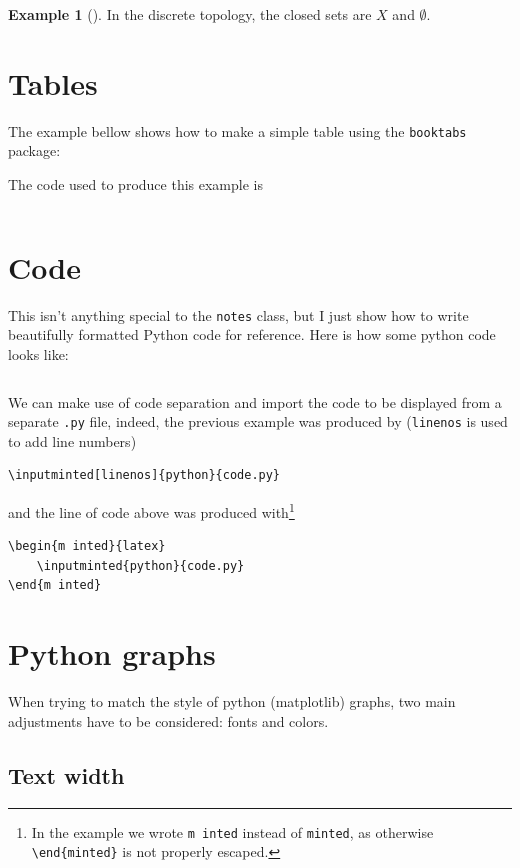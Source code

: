 \documentclass[letterpaper,11pt]{notes}
\theoremstyle{definition}
\newtheorem{Iexm}{Example}[section]
\theoremstyle{plain}
\newenvironment{exampleA}[2]
    {\begin{Iexm}[#1]\ifstrempty{#2}{}{\label{exmA:#2}}}
    {\end{Iexm}}
\theoremstyle{remark}
\begin{document}
\begin{exampleA}{}{}
In the discrete topology, the closed sets are $X$ and $\emptyset$.
\end{exampleA}

\section{Tables}

The example bellow shows how to make a simple table using the \texttt{booktabs} package:



The code used to produce this example is
\inputminted{latex}{table.tex}

\section{Code}

This isn't anything special to the \texttt{notes} class, but I just show how to write beautifully formatted Python code for reference. Here is how some python code looks like:
\inputminted[linenos]{python}{code.py}%
We can make use of code separation and import the code to be displayed from a separate \texttt{.py} file, indeed, the previous example was produced by (\texttt{linenos} is used to add line numbers)
\begin{verbatim}
\inputminted[linenos]{python}{code.py}
\end{verbatim}
and the line of code above was produced with\footnote{In the example we wrote \texttt{m inted} instead of \texttt{minted}, as otherwise \texttt{\textbackslash{}end\{minted\}} is not properly escaped.}
\begin{verbatim}
\begin{m inted}{latex}
    \inputminted{python}{code.py}
\end{m inted}
\end{verbatim}

\section{Python graphs}

When trying to match the style of python (matplotlib) graphs, two main adjustments have to be considered: fonts and colors.

\subsection{Text width}
\end{document}
